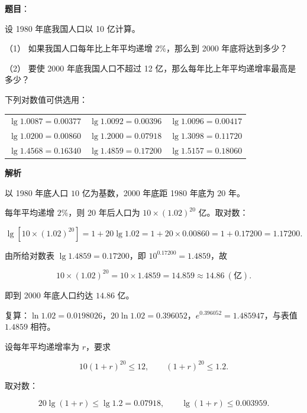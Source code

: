 \begin{answer}

\textbf{题目}：

设 1980 年底我国人口以 10 亿计算。

（1） 如果我国人口每年比上年平均递增 $2\%$，那么到 2000 年底将达到多少？

（2） 要使 2000 年底我国人口不超过 12 亿，那么每年比上年平均递增率最高是多少？

下列对数值可供选用：

\begin{center}
\begin{tabular}{lll}
\toprule
 &  &  \\
\midrule
$\lg 1.0087=0.00377$ & $\lg 1.0092=0.00396$ & $\lg 1.0096=0.00417$ \\
$\lg 1.0200=0.00860$ & $\lg 1.2000=0.07918$ & $\lg 1.3098=0.11720$ \\
$\lg 1.4568=0.16340$ & $\lg 1.4859=0.17200$ & $\lg 1.5157=0.18060$ \\
\bottomrule
\end{tabular}
\end{center}

\textbf{解析}

以 1980 年底人口 $10$ 亿为基数，2000 年底距 1980 年底为 $20$ 年。


每年平均递增 $2\%$，则 20 年后人口为 $10\times(1.02)^{20}$ 亿。取对数：

\nopagebreak[4]
\[
\lg\left[10\times(1.02)^{20}\right]=1+20\lg1.02=1+20\times0.00860=1+0.17200=1.17200.
\]

由所给对数表 $\lg1.4859=0.17200$，即 $10^{0.17200}=1.4859$，故

\nopagebreak[4]
\[
10\times(1.02)^{20}=10\times1.4859=14.859\approx14.86\ (\text{亿}).
\]

即到 2000 年底人口约达 $14.86$ 亿。

复算：$\ln1.02=0.0198026$，$20\ln1.02=0.396052$，$e^{0.396052}=1.485947$，与表值 $1.4859$ 相符。


设每年平均递增率为 $r$，要求

\nopagebreak[4]
\[
10(1+r)^{20}\leqslant12,\qquad (1+r)^{20}\leqslant1.2.
\]

取对数：

\nopagebreak[4]
\[
20\lg(1+r)\leqslant\lg1.2=0.07918,\qquad \lg(1+r)\leqslant0.003959.
\]


\end{answer}
